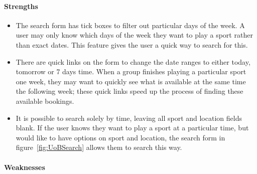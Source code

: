 \paragraph{Strengths}

\begin{itemize}
        \item The search form has tick boxes to filter out particular days of the week. A user may only know which days of the week they want to play a sport rather than exact dates. This feature gives the user a quick way to search for this.
        \item There are quick links on the form to change the date ranges to either today, tomorrow or 7 days time. When a group finishes playing a particular sport one week, they may want to quickly see what is available at the same time the following week; these quick links speed up the process of finding these available bookings.
        \item It is possible to search solely by time, leaving all sport and location fields blank. If the user knows they want to play a sport at a particular time, but would like to have options on sport and location, the search form in figure~\ref{fig:UoBSearch} allows them to search this way.
\end{itemize}

\paragraph{Weaknesses}

